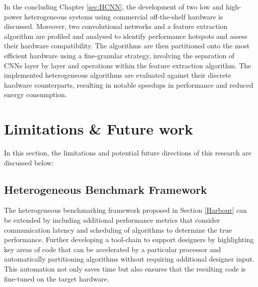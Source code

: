 In the concluding Chapter \ref{sec:HCNN}, the development of two low and high-power heterogeneous systems using commercial off-the-shelf hardware is discussed. Moreover, two convolutional networks and a feature extraction algorithm are profiled and analysed to identify performance hotspots and assess their hardware compatibility. The algorithms are then partitioned onto the most efficient hardware using a fine-granular strategy, involving the separation of CNNs layer by layer and operations within the feature extraction algorithm. The implemented heterogeneous algorithms are evaluated against their discrete hardware counterparts, resulting in notable speedups in performance and reduced energy consumption.


\section{Limitations \& Future work}\label{sec:con_ftr}
In this section, the limitations and potential future directions of this research are discussed below:

\subsection{Heterogeneous Benchmark Framework}
The heterogeneous benchmarking framework proposed in Section \ref{Harbour} can be extended by including additional performance metrics that consider communication latency and scheduling of algorithms to determine the true performance. Further developing a tool-chain to support designers by highlighting key areas of code that can be accelerated by a particular processor and automatically partitioning algorithms without requiring additional designer input. This automation not only saves time but also ensures that the resulting code is fine-tuned on the target hardware. 


